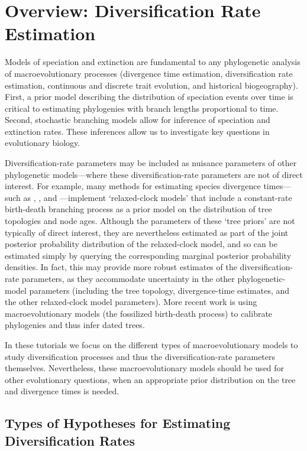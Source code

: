 \section{Overview: Diversification Rate Estimation}

Models of speciation and extinction are fundamental to any phylogenetic analysis of macroevolutionary processes (\EG divergence time estimation, diversification rate estimation, continuous and discrete trait evolution, and historical biogeography).
First, a prior model describing the distribution of speciation events over time is critical to estimating phylogenies with branch lengths proportional to time.
Second, stochastic branching models allow for inference of speciation and extinction rates.
These inferences allow us to investigate key questions in evolutionary biology.

Diversification-rate parameters may be included as nuisance parameters of other phylogenetic models---\IE where these diversification-rate parameters are not of direct interest.
For example, many methods for estimating species divergence times---such as \BEAST \citep{Drummond2012}, \MrBayes \citep{Ronquist2012}, and \RevBayes \citep{Hoehna2016b}---implement `relaxed-clock models' that include a constant-rate birth-death branching process as a prior model on the distribution of tree topologies and node ages.
Although the parameters of these `tree priors' are not typically of direct interest, they are nevertheless estimated as part of the joint posterior probability distribution of the relaxed-clock model, and so can be estimated simply by querying the corresponding marginal posterior probability densities.
In fact, this may provide more robust estimates of the diversification-rate parameters, as they accommodate uncertainty in the other phylogenetic-model parameters (including the tree topology, divergence-time estimates, and the other relaxed-clock model parameters).
More recent work \citep{Heath2014} is using macroevolutionary models (the fossilized birth-death process) to calibrate phylogenies and thus infer dated trees.

In these tutorials we focus on the different types of macroevolutionary models to study diversification processes and thus the diversification-rate parameters themselves.
Nevertheless, these macroevolutionary models should be used for other evolutionary questions, when an appropriate prior distribution on the tree and divergence times is needed.


\subsection{Types of Hypotheses for Estimating Diversification Rates}

